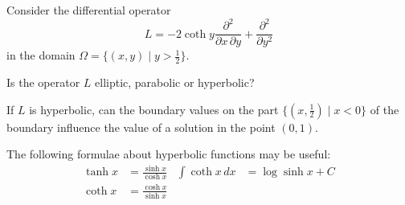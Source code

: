 Consider the differential operator
\[
L
=
-2\coth y\frac{\partial^2}{\partial x\,\partial y}
+
\frac{\partial^2}{\partial y^2}
\]
in the domain
$\Omega = \{ (x,y)\mid y > \frac12\}$.
\begin{teilaufgaben}
\item
Is the operator $L$ elliptic, parabolic or hyperbolic?
\item
If $L$ is hyperbolic, can the boundary values on the part
$\{(x,\frac12)\mid x < 0\}$ of the boundary influence the value
of a solution in the point $(0,1)$.
\end{teilaufgaben}

\begin{hinweis}
The following formulae about hyperbolic functions may be useful:
\begin{align*}
\tanh x &= \frac{\sinh x}{\cosh x}
&
\int\coth x\,dx &= \log \sinh x + C
\\
\coth x &= \frac{\cosh x}{\sinh x}
&&
\end{align*}
\end{hinweis}


